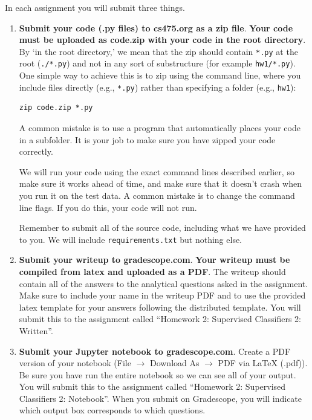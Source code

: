 \documentclass[11pt]{article}
\begin{document}
In each assignment you will submit three things.
\begin{enumerate}
\item \textbf{Submit your code (.py files) to cs475.org as a zip file}. \textbf{Your code must be uploaded as code.zip with your code in the root directory}. By `in the root directory,' we mean that the zip should contain \texttt{*.py} at the root (\texttt{./*.py}) and not in any sort of substructure (for example \texttt{hw1/*.py}). One simple way to achieve this is to zip using the command line, where you include files directly (e.g., \texttt{*.py}) rather than specifying a folder (e.g., \texttt{hw1}):
\begin{verbatim}
zip code.zip *.py
\end{verbatim}

A common mistake is to use a program that automatically places your code in a subfolder. It is your job to make sure you have zipped your code correctly.

We will run your code using the exact command lines described earlier, so make sure it works ahead of time, and make sure that it doesn't crash when you run it on the test data. A common mistake is to change the command line flags. If you do this, your code will not run.

Remember to submit all of the source code, including what we have provided to you. We will include {\tt requirements.txt} but nothing else.

\item \textbf{Submit your writeup to gradescope.com}. \textbf{Your writeup must be compiled from latex and uploaded as a PDF}. The writeup should contain all of the answers to the analytical questions asked in the assignment. Make sure to include your name in the writeup PDF and to use the provided latex template for your answers following the distributed template. You will submit this to the assignment called ``Homework 2: Supervised Classifiers 2: Written''.


\item \textbf{Submit your Jupyter notebook to gradescope.com}. Create a PDF version of your notebook (File $\rightarrow$ Download As $\rightarrow$ PDF via LaTeX (.pdf)). Be sure you have run the entire notebook so we can see all of your output. You will submit this to the assignment called ``Homework 2: Supervised Classifiers 2: Notebook''. When you submit on Gradescope, you will indicate which output box corresponds to which questions.


\end{enumerate}
\end{document}
